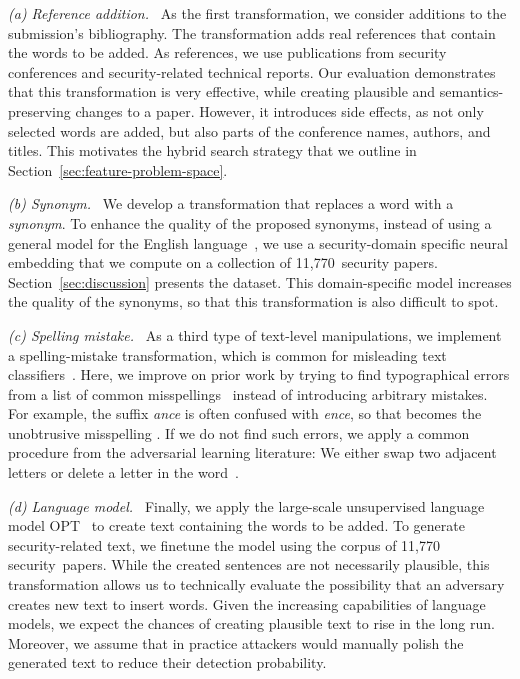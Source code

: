 \documentclass[letterpaper,twocolumn,10pt]{article}
\newcommand{\eg}{e.\,g.}
\begin{document}
\newcommand{\minipara}[1]{\emph{#1~}}

\minipara{(a) Reference addition.}
As the first transformation, we consider additions to the submission's bibliography. The transformation adds real references that contain the words to be added. As references, we use publications from security conferences and security-related technical reports. Our evaluation demonstrates that this transformation is very effective, while creating {plausible\EndAccSupp{}} and semantics-preserving changes to a paper. However, it introduces side effects, as not only selected words are added, but also parts of the conference names, authors, and titles. This motivates the hybrid search strategy that we outline in Section~\ref{sec:feature-problem-space}.

\minipara{(b) Synonym.}
We develop a transformation that replaces a word with a \emph{synonym}. To enhance the quality of the proposed synonyms, instead of using a general model for the English language~\mbox{\cite[\eg][]{li-19-textbugger, jin-20-bert, ren-19-generating}}, we use a security-domain specific {neural\EndAccSupp{}} embedding that we compute on a collection of 11,770~security papers. Section~\ref{sec:discussion} presents the dataset. This domain-specific model increases the quality of the synonyms, so that this transformation is also difficult to spot.

\minipara{(c) Spelling mistake.}
As a third type of text-level manipulations, we implement a spelling-mistake transformation, which is common for misleading text classifiers~\cite{gao-18-blackbox, liu-20-joint}. Here, we improve on prior work by trying to find typographical errors from a list of common misspellings~\cite{misc-mispellings} instead of introducing arbitrary mistakes.
For example, the {suffix\EndAccSupp{}} \emph{ance} is often confused with \emph{ence}, so that  becomes the unobtrusive misspelling . If we do not find such errors, we apply a common procedure from the adversarial learning literature: We either swap two {adjacent\EndAccSupp{}} letters or delete a letter in the word~\cite{li-19-textbugger, gao-18-blackbox, liu-20-joint}. 

\minipara{(d) Language model.} Finally, we apply the large-scale {unsupervised\EndAccSupp{}} language model \mbox{OPT}~\cite{zhang-22-opt} to create text containing the words to be added. To generate security-related text, we {finetune\EndAccSupp{}} the model using the corpus of 11,770 security~papers. While the created sentences are not necessarily {plausible\EndAccSupp{}}, this transformation allows us to technically evaluate the possibility that an adversary creates new text to insert words. Given the increasing capabilities of language models, we expect the chances of creating {plausible\EndAccSupp{}} text to rise in the long run. Moreover, we assume that in practice attackers would manually {polish\EndAccSupp{}} the generated text to reduce their detection probability.
\end{document}
